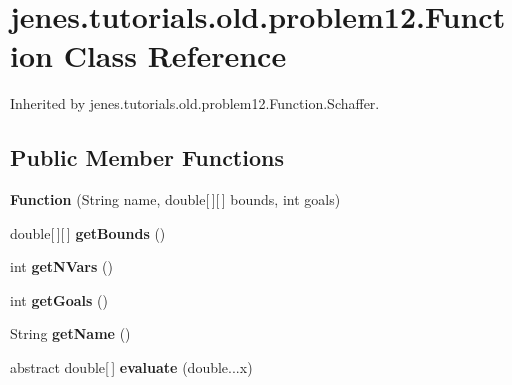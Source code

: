 \hypertarget{classjenes_1_1tutorials_1_1old_1_1problem12_1_1_function}{
\section{jenes.tutorials.old.problem12.Function Class Reference}
\label{classjenes_1_1tutorials_1_1old_1_1problem12_1_1_function}
}
Inherited by jenes.tutorials.old.problem12.Function.Schaffer.

\subsection*{Public Member Functions}
\begin{CompactItemize}
\item 
\hypertarget{classjenes_1_1tutorials_1_1old_1_1problem12_1_1_function_9c5f78b0b4d831eebec0071baa79f8ee}{
\textbf{Function} (String name, double\mbox{[}$\,$\mbox{]}\mbox{[}$\,$\mbox{]} bounds, int goals)}
\label{classjenes_1_1tutorials_1_1old_1_1problem12_1_1_function_9c5f78b0b4d831eebec0071baa79f8ee}

\item 
\hypertarget{classjenes_1_1tutorials_1_1old_1_1problem12_1_1_function_e97b45b0a6c1d5db782a138e06d2f076}{
double\mbox{[}$\,$\mbox{]}\mbox{[}$\,$\mbox{]} \textbf{getBounds} ()}
\label{classjenes_1_1tutorials_1_1old_1_1problem12_1_1_function_e97b45b0a6c1d5db782a138e06d2f076}

\item 
\hypertarget{classjenes_1_1tutorials_1_1old_1_1problem12_1_1_function_f412a211a5270eb27376db8cd0bc704d}{
int \textbf{getNVars} ()}
\label{classjenes_1_1tutorials_1_1old_1_1problem12_1_1_function_f412a211a5270eb27376db8cd0bc704d}

\item 
\hypertarget{classjenes_1_1tutorials_1_1old_1_1problem12_1_1_function_e5415395c7c1fde07fbc5581afa0273c}{
int \textbf{getGoals} ()}
\label{classjenes_1_1tutorials_1_1old_1_1problem12_1_1_function_e5415395c7c1fde07fbc5581afa0273c}

\item 
\hypertarget{classjenes_1_1tutorials_1_1old_1_1problem12_1_1_function_48a0197bf768aca5fc8154613cd30e8d}{
String \textbf{getName} ()}
\label{classjenes_1_1tutorials_1_1old_1_1problem12_1_1_function_48a0197bf768aca5fc8154613cd30e8d}

\item 
\hypertarget{classjenes_1_1tutorials_1_1old_1_1problem12_1_1_function_a1f4a7947b903e4ae9b9617940d4ed03}{
abstract double\mbox{[}$\,$\mbox{]} \textbf{evaluate} (double...x)}
\label{classjenes_1_1tutorials_1_1old_1_1problem12_1_1_function_a1f4a7947b903e4ae9b9617940d4ed03}

\end{CompactItemize}
